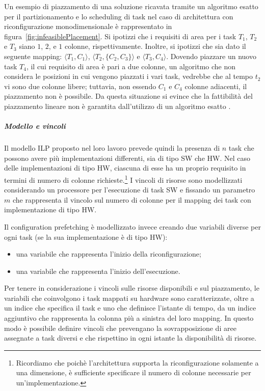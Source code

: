 Un esempio di piazzamento di una soluzione ricavata tramite un algoritmo esatto 
per il partizionamento e lo scheduling di task nel caso di 
architettura con riconfigurazione monodimensionale è rappresentato in 
figura~\ref{fig:infeasiblePlacement}. Si ipotizzi che i requisiti di area per i 
task $T_1$, $T_2$ e $T_3$ siano $1$, $2$, e $1$ colonne, rispettivamente. Inoltre, si
ipotizzi che sia dato il seguente mapping: $\langle T_1, C_1 \rangle$, $\langle
T_2, \{C_2, C_3\} \rangle$ e $\langle T_3, C_4 \rangle$. Dovendo piazzare un nuovo task 
$T_4$, il cui requisito di area è pari a due colonne, un algoritmo che non 
considera le posizioni in cui vengono piazzati i vari task, vedrebbe che al 
tempo $t_2$ vi sono due colonne libere; tuttavia, non essendo $C_1$ e $C_4$ colonne 
adiacenti, il piazzamento non è possibile. Da questa situazione si evince che 
la fattibilità del piazzamento lineare non è garantita dall'utilizzo di un 
algoritmo esatto \cite{BanerjeePhysicalConstraints}.

\subparagraph{Modello e vincoli}
Il modello \ac{ILP} proposto nel loro lavoro prevede quindi la presenza di $n$ 
task che possono avere più implementazioni differenti, sia di tipo SW che HW. 
Nel caso delle implementazioni di tipo HW, ciascuna di esse ha un proprio 
requisito in termini di numero di colonne richieste.\footnote{Ricordiamo che 
poichè l'architettura supporta la riconfigurazione solamente a una dimensione, 
è sufficiente specificare il numero di colonne necessarie per 
un'implementazione.} I vincoli di risorse sono modellizzati considerando un 
processore per l'esecuzione di task SW e fissando un parametro $m$ che 
rappresenta il vincolo sul numero di colonne per il mapping dei task con 
implementazione di tipo HW.

Il configuration prefetching è modellizzato invece creando due variabili 
diverse per ogni task (se la sua implementazione è di tipo HW):
\begin{itemize}
 \item una variabile che rappresenta l'inizio della riconfigurazione;
 \item una variabile che rappresenta l'inizio dell'esecuzione.
\end{itemize}
Per tenere in considerazione i vincoli sulle risorse disponibili e sul 
piazzamento, le variabili che coinvolgono i task mappati su hardware sono 
caratterizzate, oltre a un indice che specifica il task e uno che definisce 
l'istante di tempo, da un indice aggiuntivo che rappresenta la colonna più a 
sinistra del loro mapping. In questo modo è possibile definire vincoli che 
prevengano la sovrapposizione di aree assegnate a task diversi e che rispettino 
in ogni istante la disponibilità di risorse.

